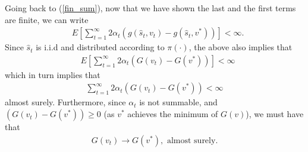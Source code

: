 \documentclass[twoside,11pt]{article}
\begin{document}
Going back to (\ref{fin_sum}), now that we have shown the last and the first terms are finite, we can write
\begin{align*}
&   E\left[ \sum_{t=1}^\infty 2\alpha_t  \left(g(\hat{s}_t,v_t) - g(\hat{s}_t,v^*)\right)\right] <\infty.
\end{align*}
Since $\hat{s}_t$ is i.i.d and distributed according to $\pi(\cdot)$, the above also implies that
\begin{align*}
&   E\left[ \sum_{t=1}^\infty 2\alpha_t  \left(G(v_t) - G(v^*)\right)\right] <\infty
\end{align*}
which in turn implies that 
\begin{align*}
\sum_{t=1}^\infty 2\alpha_t  \left(G(v_t) - G(v^*)\right) <\infty
\end{align*}
almost surely. Furthermore, since $\alpha_t$ is not summable, and $\left(G(v_t) - G(v^*)\right) \geq 0$ (as $v^*$ achieves the minimum of $G(v)$), we must have that 
\begin{align*}
G(v_t)\to G(v^*), \text{ almost surely}.
\end{align*}
\end{document}
